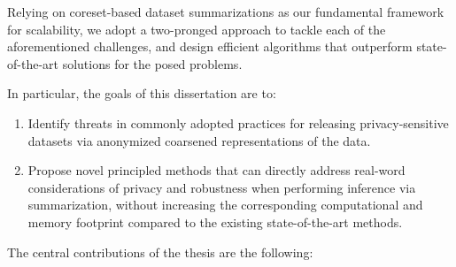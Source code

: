 Relying on coreset-based dataset summarizations as our fundamental framework for scalability, we adopt a two-pronged approach to tackle each of the aforementioned challenges, and design efficient algorithms that outperform state-of-the-art solutions for the posed problems. 


In particular, the goals of this dissertation are to:

\begin{enumerate}
	\item Identify threats in commonly adopted practices for releasing privacy-sensitive datasets via anonymized coarsened representations of the data.
	\item Propose novel principled methods that can directly address real-word considerations of privacy and robustness when performing inference via summarization, without increasing the corresponding computational and memory footprint compared to the existing state-of-the-art methods.
\end{enumerate}

The central contributions of the thesis are the following:

